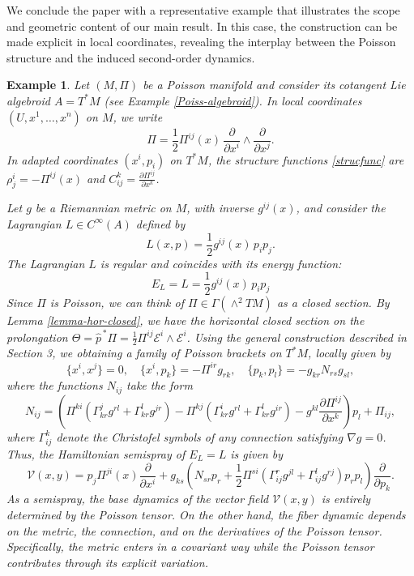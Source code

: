 \documentclass[12pt,letterpaper]{article}
\renewcommand{\hat}{\widehat}
\newtheorem{example}[theorem]{Example}
\numberwithin{equation}{section}
\begin{document}

We conclude the paper with a representative example that illustrates the scope
and geometric content of our main result. In this case, the construction can be
made explicit in local coordinates, revealing the interplay between the Poisson
structure and the induced second-order dynamics.

\begin{example}
Let $(M,\Pi)$ be a Poisson manifold and consider its cotangent Lie algebroid
$A = T^*M$ (see Example \ref{Poiss-algebroid}). In local coordinates $(U,x^1,\ldots,x^n)$ on $M$, we write
\[
\Pi = \frac{1}{2} \Pi^{ij}(x)\, \frac{\partial}{\partial x^i} \wedge \frac{\partial}{\partial x^j}.
\]
In adapted coordinates $(x^i,p_i)$ on $T^*M$, the structure functions \eqref{strucfunc} are
$\displaystyle\rho^i_j = -\Pi^{ij}(x)$ and  $\displaystyle C^k_{ij} = \frac{\partial \Pi^{ij}}{\partial x^k}$. 

Let $g$ be a Riemannian metric on $M$, with inverse $g^{ij}(x)$, and consider the Lagrangian $\displaystyle L \in C^\infty(A)$ defined by
\[
L(x,p) = \frac{1}{2} g^{ij}(x)\, p_i p_j.
\]
The Lagrangian $L$ is regular and coincides with its energy function: %
\[
E_L = L = \frac{1}{2} g^{ij}(x)\, p_i p_j
\]
Since $\Pi$ is Poisson, we can think of $\Pi\in \Gamma(\wedge^2 TM)$ as a closed section.
By Lemma \ref{lemma-hor-closed}, we have the horizontal closed section on the prolongation
$\Theta=\hat{p}^{\, *}\Pi = \frac{1}{2}\Pi^{ij}\mathcal{E}^{i}\wedge \mathcal{E}^{i}$.
Using the general construction described in Section 3, we obtaining a family of Poisson brackets on $T^*M$, locally given by
\begin{equation*}
\{  x^{i},x^{j} \}=0, \quad  \{  x^{i},p_{k} \}= -\Pi^{ir}g_{rk},  \quad    \{  p_{k},p_{l} \}= -g_{kr}N_{rs}g_{sl},
\end{equation*}
where the functions $N_{ij}$  take the form
\[
N_{ij} = \left(\Pi^{ki}(\Gamma^j_{kr}g^{rl}+\Gamma^l_{kr}g^{jr})-\Pi^{kj}(\Gamma^i_{kr}g^{rl}+\Gamma^l_{kr}g^{ir})-g^{kl}\frac{\partial \Pi^{ij}}{\partial x^k}\right)p_l + \Pi_{ij},
\]
where $\Gamma^k_{ij}$ denote the Christofel symbols of any connection satisfying $\nabla g=0$. 
Thus, the Hamiltonian semispray of $E_L=L$ is given by 
$$ \mathcal{V}(x,y)=p_j\Pi^{ji}(x)\frac{\partial}{\partial x^i}+ g_{ks}\left(N_{sr}p_r +\frac{1}{2}\Pi^{si} \left( \Gamma^r_{ij}g^{jl}+ \Gamma^l_{ij}g^{rj}\right)p_rp_l \right)\frac{\partial}{\partial p_k}. $$
As a semispray, the base dynamics of the vector field $ \mathcal{V}(x,y)$ is entirely determined by the Poisson tensor.
On the other hand, the fiber dynamic depends on the metric, the connection, and on the derivatives of the Poisson tensor. 
Specifically, the metric enters in a covariant way while the Poisson tensor contributes through its explicit variation.


\end{example}
\end{document}
